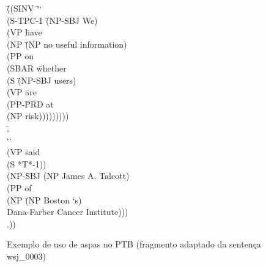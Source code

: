 \begin{figure}[!h]
    \centering
    \begin{minipage}{.8\textwidth}
        \begin{tabbing}
        \=((SINV \=\lq\lq\+\\
        \>    (S-TPC-1    \=(NP-SBJ We)\\
        \>                (VP \=have\+\\
        \>		            (NP \=(NP no useful information)\+\\
        \>			            (PP \=on\+\\
        \>			                (SBAR \=whether\+\\
        \>            				   (S \=(NP-SBJ users)\\
        \>            				      (VP \=are\+\\
        \>                					  (PP-\=PRD at\+\\
        \>                						  (NP risk)))))))))\\
        \>	\=, \\
        \>	\lq\lq\\
        \>  (VP \=said\+\\
        \>	    (S *T*-1))\-\\
        \>	(NP-\=SBJ (NP James A. Talcott)\+\\
        \>		(PP \=of\+\\
        \>		    (NP \=(NP Boston \lq s)\+\\
        \>			    Dana-Farber Cancer Institute)))\-\-\-\\
        \>	.))
        \end{tabbing}
    \end{minipage}
    \caption[Exemplo de uso de aspas no PTB]{Exemplo de uso de aspas no PTB (fragmento adaptado da sentença wsj\_0003)}
    \label{fig:ptb-quote}
\end{figure}
